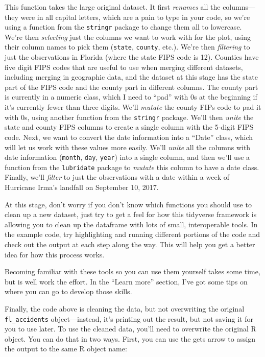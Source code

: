 \documentclass[]{tufte-book}
\begin{document}
This function takes the large
original dataset. It first \emph{renames} all the columns---they were in all capital letters,
which are a pain to type in your code, so we're using a function from the \texttt{stringr} package
to change them all to lowercase. We're then \emph{selecting} just the columns we want to work with
for the plot, using their column names to pick them (\texttt{state}, \texttt{county}, etc.). We're then
\emph{filtering} to just the observations in Florida (where the state FIPS code is 12).
Counties have five digit FIPS codes that are useful to use when merging different datasets,
including merging in geographic data, and the dataset at this stage has the state part of the
FIPS code and the county part in different columns. The county part is currently in a numeric
class, which I need to ``pad'' with 0s at the beginning if it's currently fewer than three digits.
We'll \emph{mutate} the county FIPs code to pad it with 0s, using another function from the
\texttt{stringr} package. We'll then \emph{unite} the state and county FIPS columns to create a single
column with the 5-digit FIPS code. Next, we want to convert the date information into
a ``Date'' class, which will let us work with these values more easily. We'll \emph{unite}
all the columns with date information (\texttt{month}, \texttt{day}, \texttt{year}) into a single column, and
then we'll use a function from the \texttt{lubridate} package to \emph{mutate} this column to have
a date class. Finally, we'll \emph{filter} to just the observations with a date within a week of
Hurricane Irma's landfall on September 10, 2017.

At this stage, don't worry if you don't know which functions you should use to clean up a
new dataset, just try to get a feel for how this tidyverse framework is allowing you to
clean up the dataframe with lots of small, interoperable tools. In the example code,
try highlighting and running different portions of the code and check out the output
at each step along the way. This will help you get a better idea for how this process works.

Becoming familiar with these tools so you can use them yourself takes some time, but is well
work the effort. In the ``Learn more'' section, I've got some tips on where you can go to
develop those skills.

Finally, the code above is cleaning the data, but not overwriting the original \texttt{fl\_accidents}
object---instead, it's printing out the result, but not saving it for you to use later. To
use the cleaned data, you'll need to overwrite the original R object. You can do that in
two ways. First, you can use the gets arrow to assign the output to the same R object name:
\end{document}
